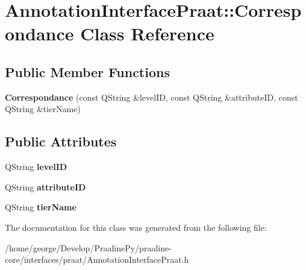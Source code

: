 \hypertarget{class_annotation_interface_praat_1_1_correspondance}{}\section{Annotation\+Interface\+Praat\+:\+:Correspondance Class Reference}
\label{class_annotation_interface_praat_1_1_correspondance}
\subsection*{Public Member Functions}
\begin{DoxyCompactItemize}
\item 
\mbox{\label{class_annotation_interface_praat_1_1_correspondance_a94a3546b1e06a49bf24685a8b4d96869}} 
{\bfseries Correspondance} (const Q\+String \&level\+ID, const Q\+String \&attribute\+ID, const Q\+String \&tier\+Name)
\end{DoxyCompactItemize}
\subsection*{Public Attributes}
\begin{DoxyCompactItemize}
\item 
\mbox{\label{class_annotation_interface_praat_1_1_correspondance_ad3521b5d25f28f8554f5e48d2a3fefe9}} 
Q\+String {\bfseries level\+ID}
\item 
\mbox{\label{class_annotation_interface_praat_1_1_correspondance_af176c947a456e08bdd9f2636426400ce}} 
Q\+String {\bfseries attribute\+ID}
\item 
\mbox{\label{class_annotation_interface_praat_1_1_correspondance_a1c123dbc9424ee99fc09bad0d9bf2a4a}} 
Q\+String {\bfseries tier\+Name}
\end{DoxyCompactItemize}


The documentation for this class was generated from the following file\+:\begin{DoxyCompactItemize}
\item 
/home/george/\+Develop/\+Praaline\+Py/praaline-\/core/interfaces/praat/Annotation\+Interface\+Praat.\+h\end{DoxyCompactItemize}
